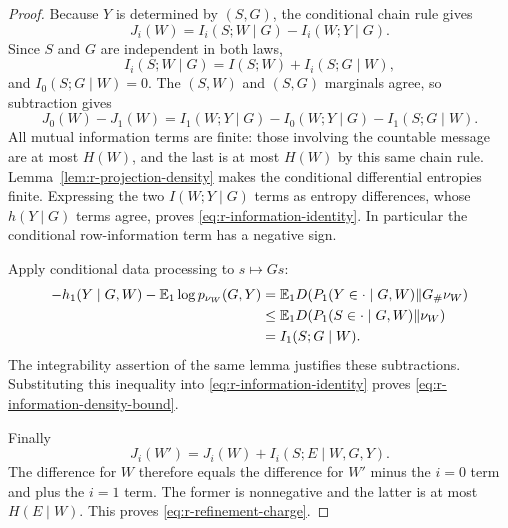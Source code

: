 \begin{proof}
Because \(Y\) is determined by \((S,G)\), the conditional chain
rule gives
\[
 J_i(W)=I_i(S;W\mid G)-I_i(W;Y\mid G).
\]
Since \(S\) and \(G\) are independent in both laws,
\[
 I_i(S;W\mid G)=I(S;W)+I_i(S;G\mid W),
\]
and \(I_0(S;G\mid W)=0\).  The \((S,W)\) and \((S,G)\)
marginals agree, so subtraction gives
\[
 J_0(W)-J_1(W)
 =I_1(W;Y\mid G)-I_0(W;Y\mid G)-I_1(S;G\mid W).
\]
All mutual information terms are finite: those involving the
countable message are at most \(H(W)\), and the last is at most
\(H(W)\) by this same chain rule.  Lemma~\ref{lem:r-projection-density}
makes the conditional differential entropies finite.  Expressing
the two \(I(W;Y\mid G)\) terms as entropy differences, whose
\(h(Y\mid G)\) terms agree, proves
\eqref{eq:r-information-identity}.  In particular the conditional
row-information term has a negative sign.

Apply conditional data processing to \(s\mapsto Gs\):
\begin{align*}
 -h_1(Y\mid G,W)-\mathbb E_1\log p_{\nu_W}(G,Y)
 &=\mathbb E_1 D(P_1(Y\in\cdot\mid G,W)\Vert G_\#\nu_W)\\
 &\le\mathbb E_1 D(P_1(S\in\cdot\mid G,W)\Vert\nu_W)\\
 &=I_1(S;G\mid W).
\end{align*}
The integrability assertion of the same lemma justifies these
subtractions.  Substituting this inequality into
\eqref{eq:r-information-identity} proves
\eqref{eq:r-information-density-bound}.

Finally
\[
 J_i(W')=J_i(W)+I_i(S;E\mid W,G,Y).
\]
The difference for \(W\) therefore equals the difference for \(W'\)
minus the \(i=0\) term and plus the \(i=1\) term.  The former is
nonnegative and the latter is at most \(H(E\mid W)\).  This proves
\eqref{eq:r-refinement-charge}.
\end{proof}
